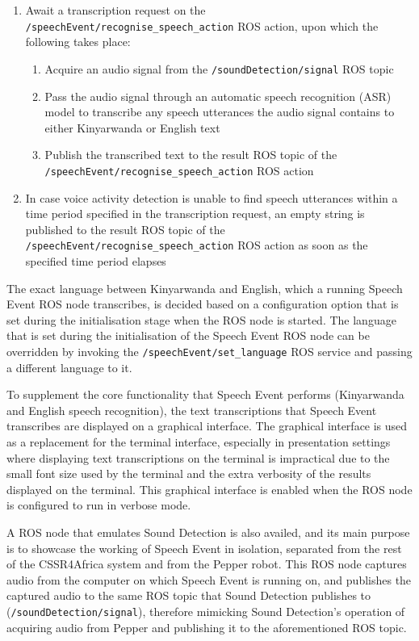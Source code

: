 \documentclass{CSSRforAfrica}
\begin{document}
\begin{enumerate}
    \item Await a transcription request on the \texttt{/speechEvent/recognise\_speech\_action} ROS action, upon which the following takes place:
    \begin{enumerate}
        \item Acquire an audio signal from the \texttt{/soundDetection/signal} ROS topic
        \item Pass the audio signal through an automatic speech recognition (ASR) model to transcribe any speech utterances the audio signal contains to either Kinyarwanda or English text
        \item Publish the transcribed text to the result ROS topic of the \\\texttt{/speechEvent/recognise\_speech\_action} ROS action
    \end{enumerate}
    \item In case voice activity detection is unable to find speech utterances within a time period specified in the transcription request, an empty string is published to the result ROS topic of the \\\texttt{/speechEvent/recognise\_speech\_action} ROS action as soon as the specified time period elapses
\end{enumerate}

The exact language between Kinyarwanda and English, which a running Speech Event ROS node transcribes, is decided based on a configuration option that is set during the initialisation stage when the ROS node is started. The language that is set during the initialisation of the Speech Event ROS node can be overridden by invoking the \texttt{/speechEvent/set\_language} ROS service and passing a different language to it.

To supplement the core functionality that Speech Event performs (Kinyarwanda and English speech recognition), the text transcriptions that Speech Event transcribes are displayed on a graphical interface. The graphical interface is used as a replacement for the terminal interface, especially in presentation settings where displaying text transcriptions on the terminal is impractical due to the small font size used by the terminal and the extra verbosity of the results displayed on the terminal. This graphical interface is enabled when the ROS node is configured to run in verbose mode.

A ROS node that emulates Sound Detection is also availed, and its main purpose is to showcase the working of Speech Event in isolation, separated from the rest of the CSSR4Africa system and from the Pepper robot. This ROS node captures audio from the computer on which Speech Event is running on, and publishes the captured audio to the same ROS topic that Sound Detection publishes to (\texttt{/soundDetection/signal}), therefore mimicking Sound Detection's operation of acquiring audio from Pepper and publishing it to the aforementioned ROS topic.
\end{document}
